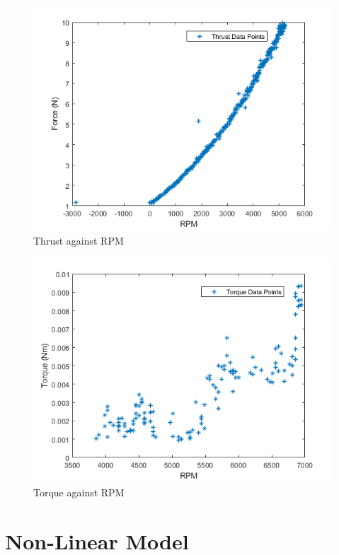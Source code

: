 \documentclass[12pt,a4paper,twoside]{report}
\begin{document}
			\begin{figure}[h!]
				\centering
				\includegraphics[width=0.7\linewidth]{ThrustData.png}
				\caption{Thrust against RPM}
				\label{fig:thrustdata}
			\end{figure}
			
			\begin{figure}[h!]
				\centering
				\includegraphics[width=0.7\linewidth]{TorqueData.png}
				\caption{Torque against RPM}
				\label{fig:torquedata}
			\end{figure}
		
		\newpage
			
		\section{Non-Linear Model}
			
\end{document}
